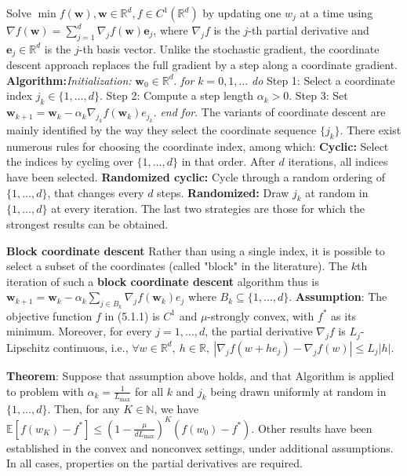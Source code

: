 \documentclass[a4paper,6pt]{extarticle}
\begin{document}
\begin{multicols}{2}
{Solve $\min f(\mathbf{w}), \mathbf{w} \in \mathbb{R}^d, f \in C^1(\mathbb{R}^d)$ by updating one $w_j$ at a time using $\nabla f(\mathbf{w}) = \sum_{j=1}^{d} \nabla_j f(\mathbf{w})\mathbf{e}_j$, where $\nabla_j f$ is the $j$-th partial derivative and $\mathbf{e}_j \in \mathbb{R}^d$ is the $j$-th basis vector. Unlike the stochastic gradient, the coordinate descent approach replaces the full gradient by a step along a coordinate gradient. \textbf{Algorithm:}\textit{Initialization:} $\mathbf{w}_0 \in \mathbb{R}^d$.
\textit{for} $k = 0, 1, \ldots$ \textit{do}
Step 1: Select a coordinate index $j_k \in \{1, \ldots, d\}$.
Step 2: Compute a step length $\alpha_k > 0$.
Step 3: Set $\mathbf{w}_{k+1} = \mathbf{w}_k - \alpha_k \nabla_{j_k} f(\mathbf{w}_k)e_{j_k}$.
\textit{end for}. The variants of coordinate descent are mainly identified by the way they select the coordinate sequence $\{j_k\}$. There exist numerous rules for choosing the coordinate index, among which: \textbf{Cyclic:} Select the indices by cycling over $\{1, \ldots, d\}$ in that order. After $d$ iterations, all indices have been selected. \textbf{Randomized cyclic:} Cycle through a random ordering of $\{1, \ldots, d\}$, that changes every $d$ steps. \textbf{Randomized:} Draw $j_k$ at random in $\{1, \ldots, d\}$ at every iteration. The last two strategies are those for which the strongest results can be obtained.

\textbf{Block coordinate descent} Rather than using a single index, it is possible to select a subset of the coordinates (called "block" in the literature). The $k$th iteration of such a \textbf{block coordinate descent} algorithm thus is
$\mathbf{w}_{k+1} = \mathbf{w}_k - \alpha_k \sum_{j \in B_k} \nabla_{j} f(\mathbf{w}_k)e_{j}$ where $B_k \subseteq \{1, \ldots, d\}$.
\textbf{Assumption}: The objective function \( f \) in (5.1.1) is \( C^1 \) and \(\mu\)-strongly convex, with \( f^* \) as its minimum. Moreover, for every \( j = 1, \ldots, d \), the partial derivative \( \nabla_j f \) is \( L_j\)-Lipschitz continuous, i.e.,
$\forall w \in \mathbb{R}^d, \ h \in \mathbb{R}, \ \left| \nabla_j f(w + he_j) - \nabla_j f(w) \right| \leq L_j |h|.$

\textbf{Theorem}: Suppose that assumption above holds, and that Algorithm is applied to problem with \( \alpha_k = \frac{1}{L_{\text{max}}} \) for all \( k \) and \( j_k \) being drawn uniformly at random in \( \{1, \ldots, d\} \). Then, for any \( K \in \mathbb{N} \), we have $\mathbb{E} \left[ f(w_K) - f^* \right] \leq \left( 1 - \frac{\mu}{dL_{\text{max}}} \right)^K (f(w_0) - f^*).$ Other results have been established in the convex and nonconvex settings, under additional assumptions. In all cases, properties on the partial derivatives are required.
}


\end{multicols}
\end{document}
